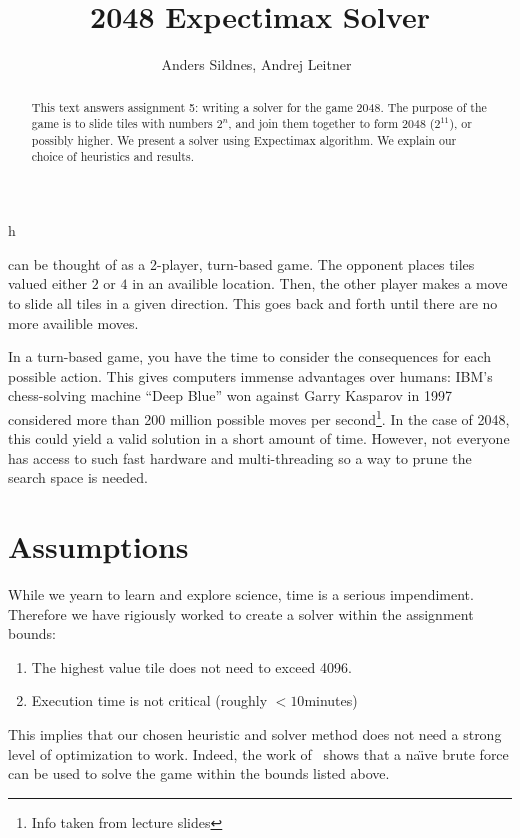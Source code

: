 \documentclass[journal]{IEEEtran}
\def\naive{na\"{\i}ve}
\begin{document}
%
\title{2048 Expectimax Solver}

\author{Anders Sildnes, Andrej Leitner~%
}%

%
{h}

\maketitle

\begin{abstract}
    This text answers assignment 5: writing a solver for the game 2048.
    The purpose of the game is to slide tiles with numbers $2^{n}$, and join them
    together to form 2048 ($2^{11}$), or possibly higher.
    We present a solver using Expectimax algorithm. We explain our choice of
    heuristics and results.
\end{abstract}

 can be thought of as a 2-player, turn-based game. The
opponent places tiles valued either $2$ or $4$ in an availible location. Then,
the other player makes a move to slide all tiles in a given direction. This
goes back and forth until there are no more availible moves.

In a turn-based game, you have the time to consider the consequences for each possible
action. This gives computers immense advantages over humans:
IBM's chess-solving machine ``Deep Blue'' won against Garry Kasparov in 1997 considered more than
200 million possible moves per second\footnote{Info taken from lecture slides}.
In the case of 2048, this could yield a valid solution in a short amount of
time. However, not everyone has access to such fast hardware and
multi-threading so a way to prune the search space is needed.

\section*{Assumptions}
While we yearn to learn and explore science, time is a serious impendiment.
Therefore we have rigiously worked to create a solver within the assignment bounds:
\begin{enumerate}
    \item The highest value tile does not need to exceed 4096.
    \item Execution time is not critical (roughly $< 10$minutes)
\end{enumerate}
This implies that our chosen heuristic and solver method does not need a strong
level of optimization to work. Indeed, the work of~\cite{brutesolver} shows that
a \naive{} brute force can be used to solve the game within the bounds listed above.
\end{document}
